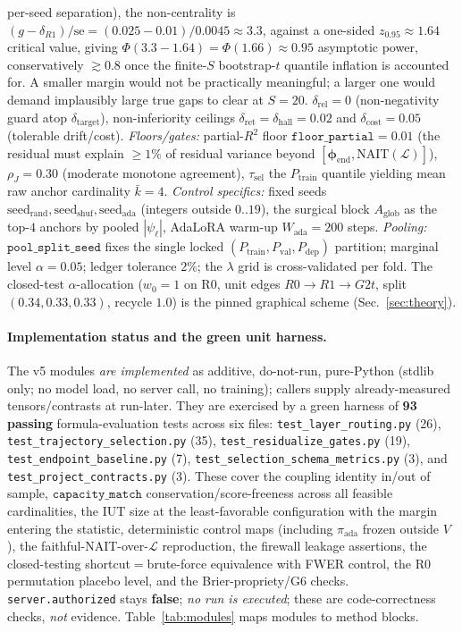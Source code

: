 \documentclass[11pt]{article}
\theoremstyle{definition}
\newcommand{\phend}{\bm{\phi}_{\mathrm{end}}}
\newcommand{\Lset}{\mathcal{L}}
\newcommand{\Vpol}{V}
\begin{document}
per-seed separation), the non-centrality is
$(g-\delta_{R1})/\mathrm{se}\!=\!(0.025-0.01)/0.0045\!\approx\!3.3$, against a one-sided
$z_{0.95}\!\approx\!1.64$ critical value, giving $\Phi(3.3-1.64)\!=\!\Phi(1.66)\!\approx\!0.95$
asymptotic power, conservatively $\gtrsim\!0.8$ once the finite-$S$ bootstrap-$t$ quantile
inflation is accounted for. A smaller margin would not be practically meaningful; a larger
one would demand implausibly large true gaps to clear at $S{=}20$. $\delta_{\mathrm{rel}}{=}0$
(non-negativity guard atop $\delta_{\mathrm{target}}$), non-inferiority ceilings
$\delta_{\mathrm{ret}}{=}\delta_{\mathrm{hall}}{=}0.02$ and $\delta_{\mathrm{cost}}{=}0.05$
(tolerable drift/cost). \emph{Floors/gates:} partial-$R^2$ floor
$\texttt{floor\_partial}{=}0.01$ (the residual must explain $\ge1\%$ of residual variance
beyond $[\phend,\mathrm{NAIT}(\Lset)]$), $\rho_J{=}0.30$ (moderate monotone agreement),
$\tau_{\mathrm{sel}}$ the $P_{\mathrm{train}}$ quantile yielding mean raw anchor
cardinality $\bar k{=}4$. \emph{Control specifics:} fixed seeds
$\mathrm{seed}_{\mathrm{rand}},\mathrm{seed}_{\mathrm{shuf}},\mathrm{seed}_{\mathrm{ada}}$
(integers outside $0..19$), the surgical block $A_{\mathrm{glob}}$ as the top-$4$ anchors
by pooled $|\psi_\ell|$, AdaLoRA warm-up $W_{\mathrm{ada}}{=}200$ steps. \emph{Pooling:}
$\texttt{pool\_split\_seed}$ fixes the single locked $(P_{\mathrm{train}},P_{\mathrm{val}},
P_{\mathrm{dep}})$ partition; marginal level $\alpha{=}0.05$; ledger tolerance
$2\%$; the $\lambda$ grid is cross-validated per fold. The closed-test $\alpha$-allocation
($w_0{=}1$ on R0, unit edges $R0{\to}R1{\to}G2t$, split $(0.34,0.33,0.33)$, recycle $1.0$)
is the pinned graphical scheme (Sec.~\ref{sec:theory}).

\paragraph{Implementation status and the green unit harness.}
The v5 modules \emph{are implemented} as additive, do-not-run, pure-Python (stdlib only; no
model load, no server call, no training); callers supply already-measured tensors/contrasts
at run-later. They are exercised by a green harness of \textbf{93 passing}
formula-evaluation tests across six files: \texttt{test\_layer\_routing.py} (26),
\texttt{test\_trajectory\_selection.py} (35), \texttt{test\_residualize\_gates.py} (19),
\texttt{test\_endpoint\_baseline.py} (7), \texttt{test\_selection\_schema\_metrics.py} (3),
and \texttt{test\_project\_contracts.py} (3). These cover the coupling identity in/out of
sample, $\texttt{capacity\_match}$ conservation/score-freeness across all feasible
cardinalities, the IUT size at the least-favorable configuration with the margin entering
the statistic, deterministic control maps (including $\pi_{\mathrm{ada}}$ frozen outside
$\Vpol$), the faithful-NAIT-over-$\Lset$ reproduction, the firewall leakage assertions, the
closed-testing shortcut$=$brute-force equivalence with FWER control, the R0 permutation
placebo level, and the Brier-propriety/G6 checks. \texttt{server.authorized} stays
\textbf{false}; \emph{no run is executed}; these are code-correctness checks, \emph{not}
evidence. Table~\ref{tab:modules} maps modules to method blocks.
\end{document}
